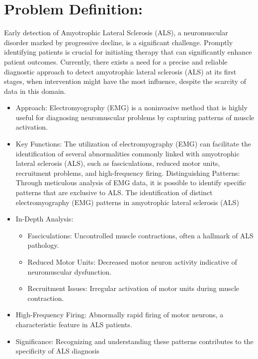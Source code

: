 \documentclass[ 12pt,a4paper,twocolumn,fleqn]{report}
\begin{document}
\section{Problem Definition:}
\vspace{2mm}
Early detection of Amyotrophic Lateral Sclerosis (ALS), a neuromuscular disorder marked by progressive decline, is a significant challenge. Promptly identifying patients is crucial for initiating therapy that can significantly enhance patient outcomes. Currently, there exists a need for a precise and reliable diagnostic approach to detect amyotrophic lateral sclerosis (ALS) at its first stages, when intervention might have the most influence, despite the scarcity of data in this domain.
\\
\begin{itemize}
    \item  Approach:
Electromyography (EMG) is a noninvasive method that is highly useful for diagnosing neuromuscular problems by capturing patterns of muscle activation.

\item Key Functions:
The utilization of electromyography (EMG) can facilitate the identification of several abnormalities commonly linked with amyotrophic lateral sclerosis (ALS), such as fasciculations, reduced motor units, recruitment problems, and high-frequency firing. Distinguishing Patterns: Through meticulous analysis of EMG data, it is possible to identify specific patterns that are exclusive to ALS. The identification of distinct electromyography (EMG) patterns in amyotrophic lateral sclerosis (ALS)

\item In-Depth Analysis:
\begin{itemize}
    \item Fasciculations: Uncontrolled muscle contractions, often a hallmark of ALS pathology.
\item Reduced Motor Units: Decreased motor neuron activity indicative of neuromuscular
dysfunction.
\item Recruitment Issues: Irregular activation of motor units during muscle contraction.

    \end{itemize}    
\end{itemize}
\newpage
  \pagestyle{fancy}
\thisfancypage{%
  \setlength{\fboxsep}{20pt}\doublebox}{}
\normalsize
\begin{itemize}
\begin{itemize}
\item High-Frequency Firing: Abnormally rapid firing of motor neurons, a characteristic
feature in ALS patients.
\item Significance: Recognizing and understanding these patterns contributes to the specificity
of ALS diagnosis
\end{itemize}
\end{itemize}
\end{document}
